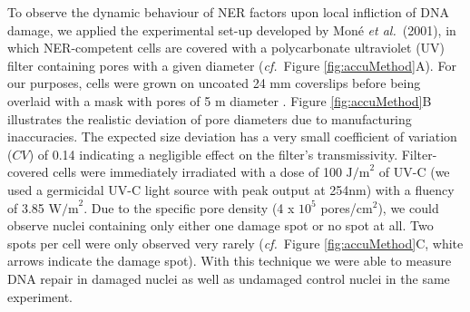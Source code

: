 To observe the dynamic behaviour of NER factors upon local infliction of DNA damage, we applied the experimental set-up developed by Mon\'e \textit{et al.}\ (2001)\cite{Mone2001}, in which NER-competent cells are covered with a polycarbonate ultraviolet (UV) filter containing pores with a given diameter (\textit{cf.}\ Figure \ref{fig:accuMethod}A). For our purposes, cells were grown on uncoated 24 mm coverslips before being overlaid with a mask with pores of 5 \textmu m diameter \cite{Verbruggen2014}. Figure \ref{fig:accuMethod}B illustrates the realistic deviation of pore diameters due to manufacturing inaccuracies. The expected size deviation has a very small coefficient of variation ($CV$) of 0.14 indicating a negligible effect on the filter's transmissivity. Filter-covered cells were immediately irradiated with a dose of 100 $\text{J/m}^\text{2}$ of UV-C (we used a germicidal UV-C light source with peak output at 254nm) with a fluency of 3.85 $\text{W/m}^\text{2}$. Due to the specific pore density (4 x $\text{10}^\text{5}$ pores/$\text{cm}^\text{2}$), we could observe nuclei containing only either one damage spot or no spot at all. Two spots per cell were only observed very rarely (\textit{cf.}\ Figure \ref{fig:accuMethod}C, white arrows indicate the damage spot). With this technique we were able to measure DNA repair in damaged nuclei as well as undamaged control nuclei in the same experiment.


